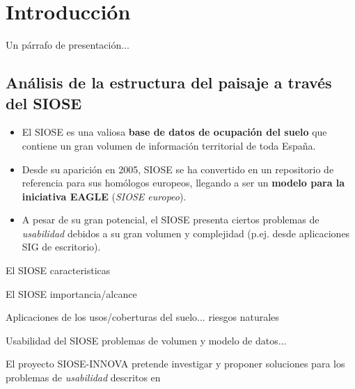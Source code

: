 
\chapter{Introducción}\label{chap:intro}

\ifpdf
    \graphicspath{{Introduccion/Figs/Raster/}{Introduccion/Figs/PDF/}{Introduccion/Figs/}}
\else
    \graphicspath{{Introduccion/Figs/Vector/}{Introduccion/Figs/}}
\fi


Un párrafo de presentación...


\section{Análisis de la estructura del paisaje a través del SIOSE}

\begin{graybox}
\begin{itemize}
\item El SIOSE es una valiosa \textbf{base de datos de ocupación del suelo} que contiene un gran volumen de información territorial de toda España.
\item Desde su aparición en 2005, SIOSE se ha convertido en un repositorio de referencia para sus homólogos europeos, llegando a ser un \textbf{modelo para la iniciativa EAGLE} (\textit{SIOSE europeo}). 
\item A pesar de su gran potencial, el SIOSE presenta ciertos problemas de \textit{usabilidad} debidos a su gran volumen y complejidad (p.ej. desde aplicaciones SIG de escritorio).
\end{itemize}
\end{graybox}


El SIOSE caracteristicas \citep{EquipoTecnicoNacionalSIOSE2015}

El SIOSE importancia/alcance

Aplicaciones de los usos/coberturas del suelo... riesgos naturales \cite{Vazquez2017}

Usabilidad del SIOSE problemas de volumen y modelo de datos... \cite{FernandezVillarino2012}

El proyecto SIOSE-INNOVA pretende investigar y proponer soluciones para los problemas de \textit{usabilidad} descritos en \citet{FernandezVillarino2012}



